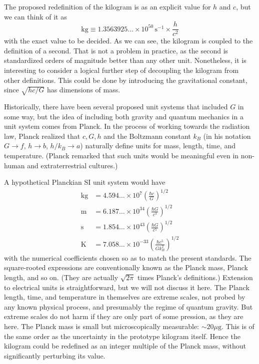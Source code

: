 \documentclass[prb,preprint]{revtex4-1}
\begin{document}
The proposed redefinition of the kilogram is as an explicit value for
$h$ and $c$, but we can think of it as
\begin{equation}
\mathrm{kg} \equiv 1.3563925\ldots \times 10^{50} \, \mathrm{s}^{-1}
                   \times \frac{h}{c^2}
\end{equation}
with the exact value to be decided.  As we can see, the kilogram is
coupled to the definition of a second.  That is not a problem in
practice, as the second is standardized orders of magnitude better
than any other unit.  Nonetheless, it is interesting to consider a
logical further step of decoupling the kilogram from other
definitions.  This could be done by introducing the gravitational
constant, since $\sqrt{hc/G}$ has dimensions of mass.

Historically, there have been several proposed unit systems that
included $G$ in some way,\cite{Tomilin1999} but the idea of including
both gravity and quantum mechanics in a unit system comes from
Planck\cite{Planck99}.  In the process of working towards the
radiation law, Planck realized that $c,G,h$ and the Boltzmann constant
$k_B$ (in his notation $G\rightarrow f$, $h\rightarrow b$,
$h/k_B\rightarrow a$) naturally define units for mass, length, time,
and temperature.  (Planck remarked that such units would be meaningful
even in non-human and extraterrestrial cultures.)

A hypothetical Planckian SI unit system would have
\begin{equation} \label{eq:defs}
\begin{aligned}
\mathrm{kg} &= 4.594\ldots \times 10^7
               \left(\frac{\hbar c}{G}\right)^{\!1/2} \\
\mathrm{m}  &= 6.187\ldots \times 10^{34}
               \left(\frac{\hbar G}{c^3}\right)^{\!1/2} \\
\mathrm{s}  &= 1.854\ldots \times 10^{43}
               \left(\frac{\hbar G}{c^5}\right)^{\!1/2} \\
\mathrm{K}  &= 7.058\ldots \times 10^{-33}
               \left(\frac{\hbar c^5}{Gk_B^2}\right)^{\!1/2}
\end{aligned}
\end{equation}
with the numerical coefficients chosen so as to match the present
standards.  The square-rooted expressions are conventionally known as
the Planck mass, Planck length, and so on.  (They are actually
$\sqrt{2\pi}$ times Planck's definitions.)  Extension to electrical
units is straightforward, but we will not discuss it here.  The Planck
length, time, and temperature in themselves are extreme scales, not
probed by any known physical process, and presumably the regime of
quantum gravity.  But extreme scales do not harm if they are only part
of some pression, as they are here.  The Planck mass is small but
microscopically measurable: $\sim20\mu\mathrm{g}$.  This is of the
same order as the uncertainty in the prototype kilogram itself.  Hence
the kilogram could be redefined as an integer multiple of the Planck
mass, without significantly perturbing its value.
\end{document}
